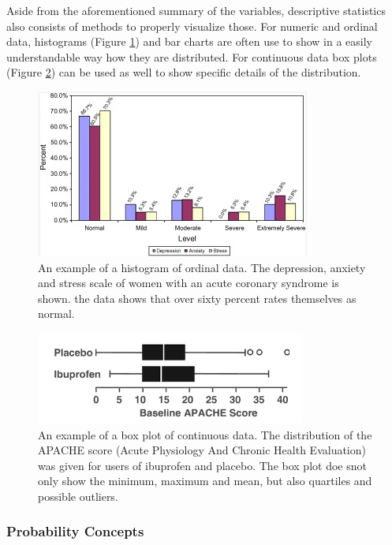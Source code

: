 \documentclass[10pt,a4paper]{report}
\begin{document}
	Aside from the aforementioned summary of the variables, descriptive statistics also consists of methods to properly visualize those. For numeric and ordinal data, histograms (Figure \ref{fig:HistEx}) and bar charts are often use to show in a easily understandable way how they are distributed. For continuous data box plots (Figure \ref{fig:BoxEx}) can be used as well to show specific details of the distribution.  \cite{dupont2009statistical}
	
	\begin{figure}[h!]
		\includegraphics{HistogramExample.PNG}
		\caption{An example of a histogram of ordinal data. The depression, anxiety and stress scale of women with an acute coronary syndrome is shown. the data shows that over sixty percent rates themselves as normal.  \cite{FISHER200993}}
		\label{fig:HistEx}
	\end{figure}
	
	\begin{figure}[h!]
		\includegraphics{BoxplotExample.PNG}
		\caption{An example of a box plot of continuous data. The distribution of the APACHE score (Acute Physiology And Chronic Health Evaluation) was given for users of ibuprofen and placebo. The box plot doe snot only show the minimum, maximum and mean, but also quartiles and possible outliers.  \cite{dupont2009statistical}}
		\label{fig:BoxEx}
	\end{figure}
	
	\subsubsection{Probability Concepts}
	
\end{document}
